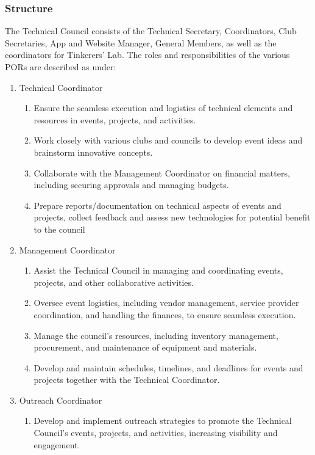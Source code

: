\documentclass[12pt]{article}
\begin{document}
\subsubsection{Structure}
The Technical Council consists of the Technical Secretary, Coordinators, Club Secretaries, App and Website Manager, General Members, as well as the coordinators for Tinkerers' Lab. The roles and responsibilities of the various PORs are described as under:
\begin{enumerate}
    \item Technical Coordinator
    \begin{enumerate}
        \item Ensure the seamless execution and logistics of technical elements and resources in events, projects, and activities.
        \item Work closely with various clubs and councils to develop event ideas and brainstorm innovative concepts.
        \item Collaborate with the Management Coordinator on financial matters, including securing approvals and managing budgets.
        \item Prepare reports/documentation on technical aspects of events and projects, collect feedback and assess new technologies for potential benefit to the council
    \end{enumerate}
    \item Management Coordinator
    \begin{enumerate}
        \item Assist the Technical Council in managing and coordinating events, projects, and other collaborative activities.
        \item Oversee event logistics, including vendor management, service provider coordination, and handling the finances, to ensure seamless execution.
        \item Manage the council's resources, including inventory management, procurement, and maintenance of equipment and materials.
        \item Develop and maintain schedules, timelines, and deadlines for events and projects together with the Technical Coordinator.
    \end{enumerate}
    \item Outreach Coordinator
    \begin{enumerate}
        \item Develop and implement outreach strategies to promote the Technical Council's events, projects, and activities, increasing visibility and engagement.

\end{enumerate}
\end{enumerate}
\end{document}
